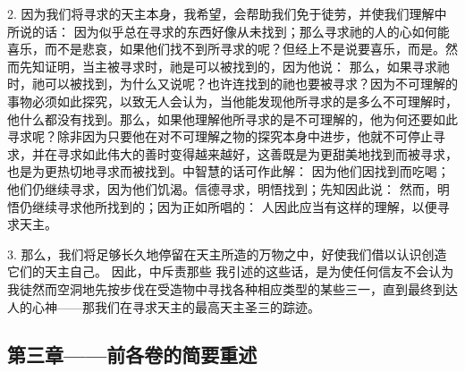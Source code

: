 2. 因为我们将寻求的天主本身，我希望，会帮助我们免于徒劳，并使我们理解中所说的话： 因为似乎总在寻求的东西好像从未找到；那么寻求祂的人的心如何能喜乐，而不是悲哀，如果他们找不到所寻求的呢？但经上不是说要喜乐，而是。然而先知证明，当主被寻求时，祂是可以被找到的，因为他说： 那么，如果寻求祂时，祂可以被找到，为什么又说呢？也许连找到的祂也要被寻求？因为不可理解的事物必须如此探究，以致无人会认为，当他能发现他所寻求的是多么不可理解时，他什么都没有找到。那么，如果他理解他所寻求的是不可理解的，他为何还要如此寻求呢？除非因为只要他在对不可理解之物的探究本身中进步，他就不可停止寻求，并在寻求如此伟大的善时变得越来越好，这善既是为更甜美地找到而被寻求，也是为更热切地寻求而被找到。中智慧的话可作此解： 因为他们因找到而吃喝；他们仍继续寻求，因为他们饥渴。信德寻求，明悟找到；先知因此说： 然而，明悟仍继续寻求他所找到的；因为正如所唱的： 人因此应当有这样的理解，以便寻求天主。\par

3. 那么，我们将足够长久地停留在天主所造的万物之中，好使我们借以认识创造它们的天主自己。 因此，中斥责那些 我引述的这些话，是为使任何信友不会认为我徒然而空洞地先按步伐在受造物中寻找各种相应类型的某些三一，直到最终到达人的心神——那我们在寻求天主的最高天主圣三的踪迹。\par


\subsection{第三章——前各卷的简要重述}

